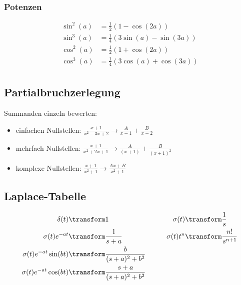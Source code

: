 \subsubsection{Potenzen}
\begin{align*}
	\sin^2(a) &= \frac{1}{2}(1 - \cos(2a)) \\
	\sin^3(a) &= \frac{1}{4}(3\sin(a) - \sin(3a)) \\
	\cos^2(a) &= \frac{1}{2}(1 + \cos(2a)) \\
	\cos^3(a) &= \frac{1}{4}(3\cos(a) + \cos(3a)) \\
\end{align*}

\subsection{Partialbruchzerlegung}
Summanden einzeln bewerten:
\begin{itemize}[nosep]
	\item einfachen Nullstellen: $\frac{x+1}{x^2 - 3x +2} \rightarrow \frac{A}{x-1} + \frac{B}{x-2}$
	\item mehrfach Nullstellen: $\frac{x+1}{x^2 + 2x +1} \rightarrow \frac{A}{(x+1)}+\frac{B}{(x+1)^2}$
	\item komplexe Nullstellen: $\frac{x+1}{x^2 + 1} \rightarrow \frac{Ax + B}{x^2 + 1}$
\end{itemize}

\subsection{Laplace-Tabelle}
\begin{align*}
	\delta(t) &\transform 1 &\qquad \sigma(t) &\transform \frac{1}{s}\\
	\sigma(t)e^{-at} &\transform \frac{1}{s+a} &\qquad \sigma(t) t^n &\transform \frac{n!}{s^{n+1}} \\
	\sigma(t)e^{-at}\sin(bt) &\transform \frac{b}{(s+a)^2 + b^2} &\qquad  &\\
	\sigma(t)e^{-at}\cos(bt) &\transform \frac{s + a}{(s+a)^2 + b^2} &\qquad &\\
\end{align*}
